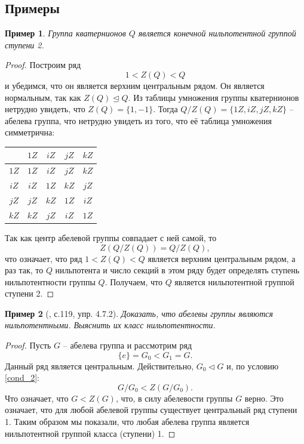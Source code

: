 \documentclass{article}
\newtheorem{example}{Пример}[section]
\begin{document}
\subsection{Примеры}

\begin{example}
    Группа кватернионов $Q$ является конечной нильпотентной группой ступени 2.
\end{example}
\begin{proof}
    Построим ряд $$ 1 < Z(Q) < Q $$ и убедимся, что он является верхним центральным рядом. Он является нормальным, так как $Z(Q) \trianglelefteq Q$.
    Из таблицы умножения группы кватернионов нетрудно увидеть, что $Z(Q) = \{ 1, -1 \}$. Тогда $Q / Z(Q) = \{ 1Z, iZ, jZ, kZ \}$ -- абелева группа, что нетрудно увидеть из того, что её таблица умножения симметрична:
    \begin{center}
        \begin{tabular}{c|cccc}
            & $1Z$ & $iZ$ & $jZ$ & $kZ$ \\
            \hline
            $1Z$ & $1Z$ & $iZ$ & $jZ$ & $kZ$ \\
            $iZ$ & $iZ$ & $1Z$ & $kZ$ & $jZ$ \\
            $jZ$ & $jZ$ & $kZ$ & $1Z$ & $iZ$ \\
            $kZ$ & $kZ$ & $jZ$ & $iZ$ & $1Z$
        \end{tabular}
    \end{center}
    Так как центр абелевой группы совпадает с ней самой, то $$ Z(Q / Z(Q)) = Q / Z(Q), $$ что означает, что ряд $1 < Z(Q) < Q$ является верхним центральным рядом, а раз так, то $Q$ нильпотента и число секций в этом ряду будет определять ступень нильпотентности группы $Q$. Получаем, что $Q$ является нильпотентной группой ступени 2.
\end{proof}

\begin{example}[\cite{lyapin}, с.119, упр. 4.7.2] \label{meqwiop}
    Доказать, что абелевы группы являются нильпотентными. Выяснить их класс нильпотентности.
\end{example}
\begin{proof}
    Пусть $G$ -- абелева группа и рассмотрим ряд $$ \{ e \} = G_0 < G_1 = G. $$ Данный ряд является центральным. Действительно, $G_0 \triangleleft G$ и, по условию \eqref{cond_2}: $$ G / G_0 < Z(G / G_0). $$ Что означает, что $G < Z(G)$, что, в силу абелевости группы $G$ верно. Это означает, что для любой абелевой группы существует центральный ряд ступени 1.
    Таким образом мы показали, что любая абелева группа является нильпотентной группой класса (ступени) 1.
\end{proof}
\end{document}
